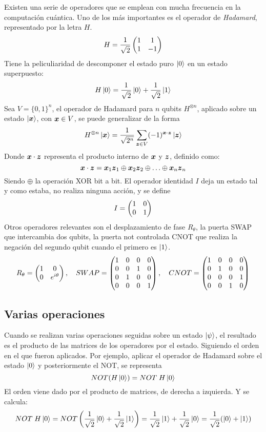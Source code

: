 Existen una serie de operadores que se emplean con mucha frecuencia en la 
computación cuántica. Uno de los más importantes es el operador de 
\textit{Hadamard}, representado por la letra $H$.
%
$$ H = \frac{1}{\sqrt 2} \begin{pmatrix} 1 & 1 \\ 1 & -1 \end{pmatrix} $$
%
Tiene la peliculiaridad de descomponer el estado puro $\ket{0}$ en un estado 
superpuesto:
%
$$ H \ket{0} = \frac{1}{\sqrt 2}\ket{0} + \frac{1}{\sqrt 2}\ket{1} $$
%
%
Sea $V =  \{0,1\}^n$, el operador de Hadamard para $n$ qubits $H^{\otimes n}$, 
aplicado sobre un estado $\ket{\boldsymbol{x}}$, con $\boldsymbol{x} \in V$, se puede generalizar de 
la forma
%
$$ H^{\otimes n} \ket{\boldsymbol{x}} = \frac 1 {\sqrt {2^n}} \sum_{\boldsymbol{z} \in V} (-1)^{\boldsymbol{x} 
\cdot \boldsymbol{z}} \ket{\boldsymbol{z}}$$
%
Donde $ \boldsymbol{x} \cdot  \boldsymbol{z}$ representa el producto interno de $\boldsymbol{x}$ y $\boldsymbol{z}$, 
definido como:
$$ \boldsymbol{x} \cdot \boldsymbol{z} = \boldsymbol{x}_1 \boldsymbol{z}_1 \oplus \boldsymbol{x}_2 \boldsymbol{z}_2 \oplus \ldots \oplus \boldsymbol{x}_n \boldsymbol{z}_n$$
%
Siendo $\oplus$ la operación XOR bit a bit. El operador identidad $I$ deja un 
estado tal y como estaba, no realiza ninguna acción, y se define
%
$$ I = \begin{pmatrix} 1&0 \\ 0&1 \end{pmatrix}$$
%
Otros operadores relevantes son el desplazamiento de fase $R_\theta$, la puerta 
SWAP que intercambia dos qubits, la puerta not controlada CNOT que realiza la 
negación del segundo qubit cuando el primero es $\ket{1}$.
$$ R_\theta = \begin{pmatrix} 1 & 0 \\ 0 & e^{i\theta} \end{pmatrix}, \quad
SWAP = \begin{pmatrix} 1&0&0&0 \\ 0&0&1&0 \\ 0&1&0&0 \\ 0&0&0&1 \end{pmatrix}, \quad
CNOT = \begin{pmatrix} 1&0&0&0 \\ 0&1&0&0 \\ 0&0&0&1 \\ 0&0&1&0 \end{pmatrix}
$$


\subsection{Varias operaciones}

Cuando se realizan varias operaciones seguidas sobre un estado $\ket{\psi}$, el 
resultado es el producto de las matrices de los operadores por el estado.  
Siguiendo el orden en el que fueron aplicados. Por ejemplo, aplicar el operador 
de Hadamard sobre el estado $\ket{0}$ y posteriormente el NOT, se representa
%
$$ NOT(H\ket{0}) = NOT\; H \ket{0} $$
%
El orden viene dado por el producto de matrices, de derecha a izquierda. Y se 
calcula:
%
$$ NOT\; H \ket{0} = NOT\left(\frac{1}{\sqrt 2}\ket{0} + \frac{1}{\sqrt 
2}\ket{1}\right) =
\frac{1}{\sqrt 2}\ket{1} + \frac{1}{\sqrt 2}\ket{0} = \frac{1}{\sqrt 2}(\ket{0} 
+ \ket{1}) $$

